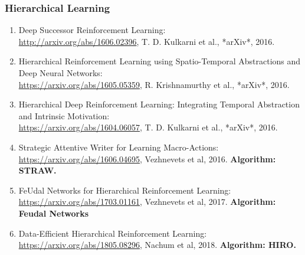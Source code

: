 \documentclass[lang=cn,11pt,a4paper]{elegant_template}
\begin{document}
\subsubsection{Hierarchical Learning}
\begin{enumerate}
    \item Deep Successor Reinforcement Learning:\\ \href{http://arxiv.org/abs/1606.02396}{http://arxiv.org/abs/1606.02396}, T. D. Kulkarni et al., *arXiv*, 2016.
    \item Hierarchical Reinforcement Learning using Spatio-Temporal Abstractions and Deep Neural Networks:\\ \href{https://arxiv.org/abs/1605.05359}{https://arxiv.org/abs/1605.05359}, R. Krishnamurthy et al., *arXiv*, 2016.
    \item Hierarchical Deep Reinforcement Learning: Integrating Temporal Abstraction and Intrinsic Motivation:\\ \href{https://arxiv.org/abs/1604.06057}{https://arxiv.org/abs/1604.06057}, T. D. Kulkarni et al., *arXiv*, 2016.
    \item Strategic Attentive Writer for Learning Macro-Actions:\\ \href{https://arxiv.org/abs/1606.04695}{https://arxiv.org/abs/1606.04695}, Vezhnevets et al, 2016. \textbf{Algorithm: STRAW.}
    \item FeUdal Networks for Hierarchical Reinforcement Learning:\\ \href{https://arxiv.org/abs/1703.01161}{https://arxiv.org/abs/1703.01161}, Vezhnevets et al, 2017. \textbf{Algorithm: Feudal Networks}
    \item Data-Efficient Hierarchical Reinforcement Learning:\\ \href{https://arxiv.org/abs/1805.08296}{https://arxiv.org/abs/1805.08296}, Nachum et al, 2018. \textbf{Algorithm: HIRO.}
\end{enumerate}
\end{document}
